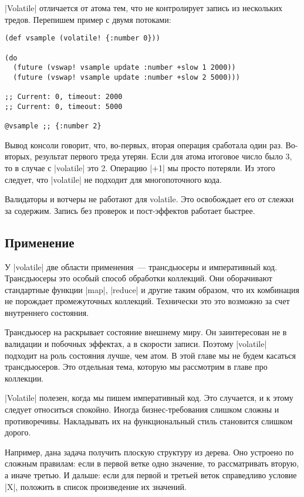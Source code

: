 \spverb|Volatile| отличается от атома тем, что не контролирует запись из нескольких
тредов. Перепишем пример с двумя потоками:

\begin{verbatim}
(def vsample (volatile! {:number 0}))

(do
  (future (vswap! vsample update :number +slow 1 2000))
  (future (vswap! vsample update :number +slow 2 5000)))

;; Current: 0, timeout: 2000
;; Current: 0, timeout: 5000

@vsample ;; {:number 2}
\end{verbatim}

Вывод консоли говорит, что, во-первых, вторая операция сработала один
раз. Во-вторых, результат первого треда утерян. Если для атома итоговое число
было 3, то в случае с \spverb|volatile| это 2. Операцию \spverb|+1| мы просто потеряли. Из
этого следует, что \spverb|volatile| не подходит для многопоточного кода.

Валидаторы и вотчеры не работают для volatile. Это освобождает его от слежки за
содержим. Запись без проверок и пост-эффектов работает быстрее.

\subsection{Применение}

У \spverb|volatile| две области применения~--- трансдьюсеры и императивный
код. Трансдьюсеры это особый способ обработки коллекций. Они оборачивают
стандартные функции \spverb|map|, \spverb|reduce| и другие таким образом, что их комбинация не
порождает промежуточных коллекций. Технически это это возможно за счет
внутреннего состояния.

Трансдьюсер на раскрывает состояние внешнему миру. Он заинтересован не в
валидации и побочных эффектах, а в скорости записи. Поэтому \spverb|volatile| подходит
на роль состояния лучше, чем атом. В этой главе мы не будем касаться
трансдьюсеров. Это отдельная тема, которую мы рассмотрим в главе про коллекции.

\spverb|Volatile| полезен, когда мы пишем императивный код. Это случается, и к этому
следует относиться спокойно. Иногда бизнес-требования слишком сложны и
противоречивы. Накладывать их на функциональный стиль становится слишком дорого.

Например, дана задача получить плоскую структуру из дерева. Оно устроено по
сложным правилам: если в первой ветке одно значение, то рассматривать вторую, а
иначе третью. И дальше: если для первой и третьей веток справедливо условие \spverb|X|,
положить в список произведение их значений.

